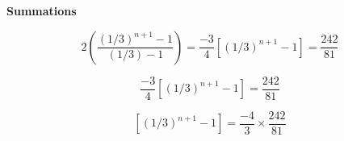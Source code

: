 

\noindent\textbf{Summations}

\[    2 \left( \frac{(1/3)^{n+1}-1}{(1/3)-1} \right)  = \frac{-3}{4} \left[ (1/3)^{n+1}-1 \right]  = \frac{242}{81} \]

\[     \frac{-3}{4} \left[ (1/3)^{n+1}-1 \right]  = \frac{242}{81} \]

\[      \left[ (1/3)^{n+1}-1 \right]  =  \frac{-4}{3} \times \frac{242}{81} \]


